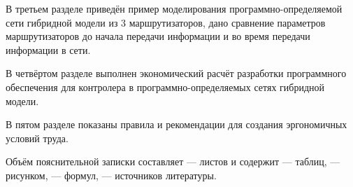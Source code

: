 В третьем разделе приведён пример моделирования программно-определяемой сети гибридной модели из 3 маршрутизаторов, дано сравнение параметров
маршрутизаторов до начала передачи информации и во время передачи информации в сети.

В четвёртом разделе выполнен экономический расчёт разработки программного
обеспечения для контролера в программно-определяемых сетях гибридной модели.

В пятом разделе показаны правила и рекомендации для создания эргономичных
условий труда.

Объём пояснительной записки составляет --- листов и содержит
--- таблиц, --- рисунком, --- формул, --- источников литературы.
